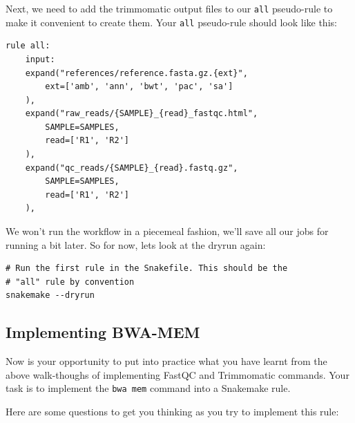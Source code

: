 Next, we need to add the trimmomatic output files to our \texttt{all} pseudo-rule to make it convenient to create them. Your \texttt{all}
pseudo-rule should look like this:

\begin{lstlisting}
rule all:
	input:
	expand("references/reference.fasta.gz.{ext}",
		ext=['amb', 'ann', 'bwt', 'pac', 'sa']
	),
	expand("raw_reads/{SAMPLE}_{read}_fastqc.html",
		SAMPLE=SAMPLES,
		read=['R1', 'R2']
	),
	expand("qc_reads/{SAMPLE}_{read}.fastq.gz",
		SAMPLE=SAMPLES,
		read=['R1', 'R2']
	),
\end{lstlisting}

We won't run the workflow in a piecemeal fashion, we'll save all our jobs for running a bit later. So for now, lets look at the dryrun again:

\begin{lstlisting}
# Run the first rule in the Snakefile. This should be the
# "all" rule by convention
snakemake --dryrun
\end{lstlisting}

\subsection{Implementing BWA-MEM}

Now is your opportunity to put into practice what you have learnt from the above walk-thoughs of implementing
FastQC and Trimmomatic commands. Your task is to implement the \texttt{bwa mem} command into a Snakemake rule.

Here are some questions to get you thinking as you try to implement this rule:

